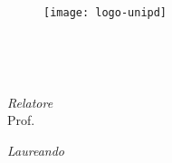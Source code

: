 
\begin{titlepage}

\begin{center}

\begin{LARGE}
\textbf{\myUni}\\
\end{LARGE}

\vspace{10pt}

\begin{Large}
\textsc{\myDepartment}\\
\end{Large}

\vspace{10pt}

\begin{large}
\textsc{\myFaculty}\\
\end{large}

\vspace{30pt}
\begin{figure}[htbp]
\begin{center}
\texttt{[image: logo-unipd]}
\end{center}
\end{figure}
\vspace{30pt} 

\begin{LARGE}
\begin{center}
\textbf{\myTitle}\\
\end{center}
\end{LARGE}

\vspace{10pt} 

\begin{large}
\textsl{\myDegree}\\
\end{large}

\vspace{160pt} 

\par
\noindent
\begin{minipage}[t]{0.47\textwidth}
{\large{
\textit{Relatore}\\ 
Prof. \myProf}}
\end{minipage}
\hfill
\begin{minipage}[t]{0.47\textwidth}\raggedleft
{\large{
\textit{Laureando}\\
\myName}}
\end{minipage}


\end{center}
\end{titlepage}
